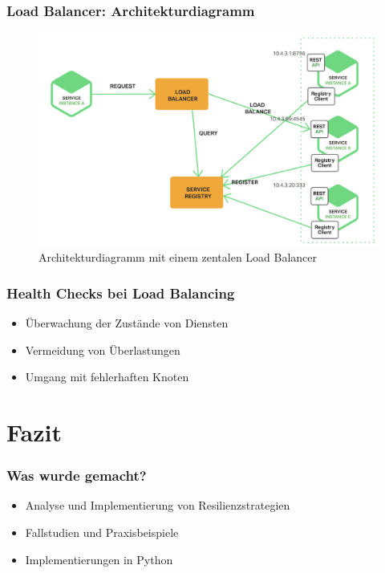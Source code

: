 \begin{frame}
    \frametitle{Load Balancer: Architekturdiagramm}
    \begin{figure}[h]
        \centering
        \includegraphics[height=0.5\textheight]{images/loadbalancer}
        \caption{Architekturdiagramm mit einem zentalen Load Balancer}
    \end{figure}
\end{frame}


\begin{frame}
    \frametitle{Health Checks bei Load Balancing}
    \begin{itemize}
        \item Überwachung der Zustände von Diensten
        \item Vermeidung von Überlastungen
        \item Umgang mit fehlerhaften Knoten
    \end{itemize}
\end{frame}

\section{Fazit}

\begin{frame}
    \frametitle{Was wurde gemacht?}
    \begin{itemize}
        \item Analyse und Implementierung von Resilienzstrategien
        \item Fallstudien und Praxisbeispiele
        \item Implementierungen in Python
    \end{itemize}
\end{frame}

